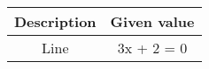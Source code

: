 \begin{tabular}{ |c| c|}
    \hline
    \textbf{Description}  & \textbf{ Given value}\\
    \hline
    Line & 3x + 2 = 0 \\
    \hline
\end{tabular}
